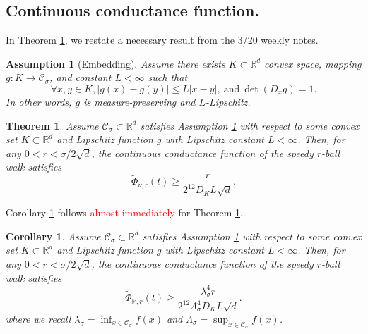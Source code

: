 \documentclass{article}
\newcommand{\Reals}{\mathbb{R}}
\newcommand{\abs}[1]{\left \lvert #1 \right \rvert}
\newcommand{\Rd}{\Reals^d}
\newcommand{\Cset}{\mathcal{C}}
\newcommand{\Csig}{\Cset_{\sigma}}
\newcommand{\Pbb}{\mathbb{P}}
\newcommand{\1}{\mathbf{1}}
\theoremstyle{alden}
\theoremstyle{aldenthm}
\newtheorem{theorem}{Theorem}
\newtheorem{corollary}{Corollary}
\newtheorem{assumption}{Assumption}
\theoremstyle{remark}
\begin{document}
\subsection{Continuous conductance function.}

In Theorem \ref{thm: continuous_conductance_function}, we restate a necessary result from the 3/20 weekly notes. 

\begin{assumption}[Embedding]
	\label{asmp: embedding}
	Assume there exists $K \subset \Rd$ convex space, mapping $g: K \to \Csig$, and constant $L < \infty$ such that
	\begin{equation*}
	\forall x,y \in K,  \abs{g(x) - g(y)} \leq L \abs{x - y},~\text{and}~ \det(D_x g) = 1.
	\end{equation*}
	In other words, $g$ is measure-preserving and $L$-Lipschitz.
\end{assumption}

\begin{theorem}
	\label{thm: continuous_conductance_function}
	Assume $\Csig \subset \Rd$ satisfies Assumption \ref{asmp: embedding} with respect to some convex set $K \subset \Rd$ and Lipschitz function $g$ with Lipschitz constant $L <  \infty$. Then, for any $0 < r < \sigma / 2 \sqrt{d}$, the continuous conductance function of the speedy $r$-ball walk satisfies
	\begin{equation*}
	\widetilde{\Phi}_{\nu,r}(t) \geq \frac{r}{2^{12} D_K L \sqrt{d}}.
	\end{equation*}
\end{theorem}

Corollary \ref{cor: nonuniform_continuous_conductance} follows \textcolor{red}{almost immediately} for Theorem \ref{thm: continuous_conductance_function}.

\begin{corollary}
	\label{cor: nonuniform_continuous_conductance}
	Assume $\Csig \subset \Rd$ satisfies Assumption \ref{asmp: embedding} with respect to some convex set $K \subset \Rd$ and Lipschitz function $g$ with Lipschitz constant $L <  \infty$. Then, for any $0 < r < \sigma / 2 \sqrt{d}$, the continuous conductance function of the speedy $r$-ball walk satisfies
	\begin{equation*}
	\widetilde{\Phi}_{\Pbb,r}(t) \geq \frac{\lambda_{\sigma}^4 r}{2^{12} \Lambda_{\sigma}^4 D_K L \sqrt{d}}.
	\end{equation*}
	where we recall $\lambda_{\sigma} = \inf_{x \in \Csig} f(x)$ and $\Lambda_{\sigma} = \sup_{x \in \Csig} f(x)$. 
\end{corollary}
\end{document}
